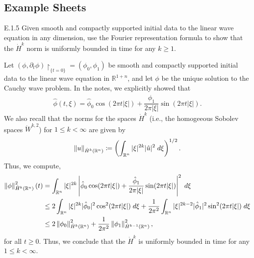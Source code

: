 \documentclass{article}
\begin{document}
\subsection{Example Sheets}
\begin{prb}{E.1.5}
	Given smooth and compactly supported initial data to the linear wave equation in any dimension, use the Fourier representation formula to show that the $\dot{H}^{k}$ norm is uniformly bounded in time for any $k \geq 1$. 
\end{prb} 
Let $(\phi, \partial_{t}\phi)\upharpoonright_{\{t = 0\}} = (\phi_{0}, \phi_{1})$ be smooth and compactly supported initial data to the linear wave equation in $\mathbb{R}^{1 + n}$, and let $\phi$ be the unique solution to the Cauchy wave problem. In the notes, we explicitly showed that 
\begin{equation*}
	\hat{\phi}(t, \xi) = \hat{\phi}_{0}\cos(2\pi t |\xi|) + \frac{\hat{\phi}_{1}}{2\pi |\xi|}\sin(2\pi t |\xi|). 
\end{equation*}
We also recall that the norms for the spaces $\dot{H}^{k}$ (i.e., the homogeeous Sobolev spaces $\dot{W}^{k, 2}$) for $1 \leq k < \infty$ are given by
\begin{equation*}
	\left\Vert u \right\Vert_{\dot{H}^{k}(\mathbb{R}^{n})} \coloneqq \left(\int_{\mathbb{R}^{n}}|\xi|^{2k}|\hat{u}|^{2}\;d\xi\right)^{1/2}. 
\end{equation*}
Thus, we compute, 
\begin{align*}
	\begin{split}
		\left\Vert \phi \right\Vert_{\dot{H}^{k}(\mathbb{R}^{n})}^{2}(t) &= \int_{\mathbb{R}^{n}}|\xi|^{2k}\left| \hat{\phi}_{0}\cos(2\pi t |\xi|) + \frac{\hat{\phi}_{1}}{2\pi |\xi|}\sin(2\pi t|\xi|) \right|^{2}\;d\xi \\
		&\leq 2\int_{\mathbb{R}^{n}}|\xi|^{2k}|\hat{\phi}_{0}|^{2}\cos^{2}(2\pi t|\xi|)\;d\xi + \frac{1}{2\pi^{2}}\int_{\mathbb{R}^{n}}|\xi|^{2k - 2}|\hat{\phi}_{1}|^{2}\sin^{2}(2\pi t |\xi|)\;d\xi \\
		&\leq 2\left\Vert \phi_{0} \right\Vert_{\dot{H}^{k}(\mathbb{R}^{n})}^{2} + \frac{1}{2\pi^{2}}\left\Vert \phi_{1} \right\Vert_{\dot{H}^{k - 1}(\mathbb{R}^{n})}^{2}, 
	\end{split} 
\end{align*}
for all $t \geq 0$. Thus, we conclude that the $\dot{H}^{k}$ is uniformly bounded in time for any $1 \leq k <\infty$. 
\end{document}
